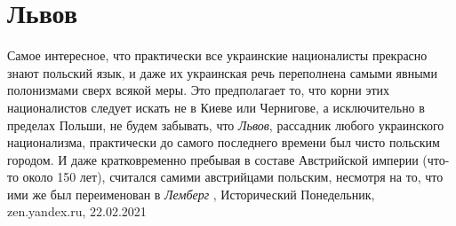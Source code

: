  
 
 
 
 
\chapter{Львов}

Самое интересное, что практически все украинские националисты прекрасно знают
польский язык, и даже их украинская речь переполнена самыми явными полонизмами
сверх всякой меры. Это предполагает то, что корни этих националистов следует
искать не в Киеве или Чернигове, а исключительно в пределах Польши, не будем
забывать, что \emph{Львов}, рассадник любого украинского национализма, практически до
самого последнего времени был чисто польским городом. И даже кратковременно
пребывая в составе Австрийской империи (что-то около 150 лет), считался самими
австрийцами польским, несмотря на то, что ими же был переименован в \emph{Лемберг}
, 
Исторический Понедельник, zen.yandex.ru, 22.02.2021 

